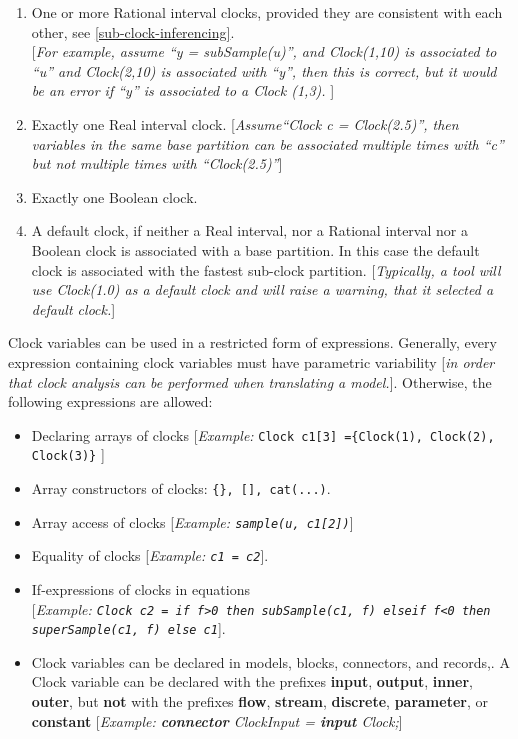 \begin{enumerate}
\item
  One or more Rational interval clocks, provided they are consistent
  with each other, see \autoref{sub-clock-inferencing}.\\
  {[}\emph{For example, assume ``y = subSample(u)'', and Clock(1,10) is
  associated to ``u'' and Clock(2,10) is associated with ``y'', then
  this is correct, but it would be an error if ``y'' is associated to a
  Clock (1,3).} {]}
\item
  Exactly one Real interval clock. {[}\emph{Assume``Clock c =
  Clock(2.5)'', then variables in the same base partition can be
  associated multiple times with ``c'' but not multiple times with
  ``Clock(2.5)''}{]}
\item
  Exactly one Boolean clock.
\item
  A default clock, if neither a Real interval, nor a Rational interval
  nor a Boolean clock is associated with a base partition. In this case
  the default clock is associated with the fastest sub-clock partition.
  {[}\emph{Typically, a tool will use Clock(1.0) as a default clock and
  will raise a warning, that it selected a default clock.}{]}
\end{enumerate}

Clock variables can be used in a restricted form of expressions.
Generally, every expression containing clock variables must have
parametric variability {[}\emph{in order that clock analysis can be
performed when translating a model.}{]}. Otherwise, the following
expressions are allowed:

\begin{itemize}
\item
  Declaring arrays of clocks {[}\emph{Example:} \lstinline!Clock c1[3] ={Clock(1), Clock(2), Clock(3)}! {]}
\item
  Array constructors of clocks: \lstinline!{}, [], cat(...)!.
\item
  Array access of clocks {[}\emph{Example:  \lstinline!sample(u, c1[2])!}{]}
\item
  Equality of clocks {[}\emph{Example: \lstinline!c1 = c2!}{]}.
\item
  If-expressions of clocks in equations\\
  {[}\emph{Example: \lstinline!Clock c2 = if f>0 then subSample(c1, f) elseif f<0 then superSample(c1, f) else c1!}{]}.
\item
  Clock variables can be declared in models, blocks, connectors, and
  records,. A Clock variable can be declared with the prefixes
  \textbf{input}, \textbf{output}, \textbf{inner}, \textbf{outer}, but
  \textbf{not} with the prefixes \textbf{flow}, \textbf{stream},
  \textbf{discrete}, \textbf{parameter}, or \textbf{constant}
  {[}\emph{Example: \textbf{connector} ClockInput = \textbf{input}
  Clock;}{]}
\end{itemize}

